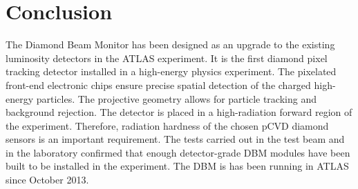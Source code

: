 \section{Conclusion}
\label{sec:limitations}
The Diamond Beam Monitor has been designed as an upgrade to the existing luminosity detectors in the ATLAS experiment. It is the first diamond pixel tracking detector installed in a high-energy physics experiment. The pixelated front-end electronic chips ensure precise spatial detection of the charged high-energy particles. The projective geometry allows for particle tracking and background rejection. The detector is placed in a high-radiation forward region of the experiment. Therefore, radiation hardness of the chosen pCVD diamond sensors is an important requirement. The tests carried out in the test beam and in the laboratory confirmed that enough detector-grade DBM modules have been built to be installed in the experiment. The DBM is has been running in ATLAS since October 2013.
